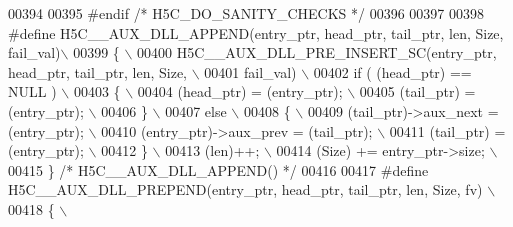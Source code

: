 \begin{DoxyCode}
00394 
00395 \textcolor{preprocessor}{#endif }\textcolor{comment}{/* H5C\_DO\_SANITY\_CHECKS */}\textcolor{preprocessor}{}
00396 
00397 
00398 \textcolor{preprocessor}{#define H5C\_\_AUX\_DLL\_APPEND(entry\_ptr, head\_ptr, tail\_ptr, len, Size, fail\_val)\(\backslash\)}
00399 \textcolor{preprocessor}{\{                                                                              \(\backslash\)}
00400 \textcolor{preprocessor}{    H5C\_\_AUX\_DLL\_PRE\_INSERT\_SC(entry\_ptr, head\_ptr, tail\_ptr, len, Size,       \(\backslash\)}
00401 \textcolor{preprocessor}{                               fail\_val)                                       \(\backslash\)}
00402 \textcolor{preprocessor}{    if ( (head\_ptr) == NULL )                                                  \(\backslash\)}
00403 \textcolor{preprocessor}{    \{                                                                          \(\backslash\)}
00404 \textcolor{preprocessor}{       (head\_ptr) = (entry\_ptr);                                               \(\backslash\)}
00405 \textcolor{preprocessor}{       (tail\_ptr) = (entry\_ptr);                                               \(\backslash\)}
00406 \textcolor{preprocessor}{    \}                                                                          \(\backslash\)}
00407 \textcolor{preprocessor}{    else                                                                       \(\backslash\)}
00408 \textcolor{preprocessor}{    \{                                                                          \(\backslash\)}
00409 \textcolor{preprocessor}{       (tail\_ptr)->aux\_next = (entry\_ptr);                                     \(\backslash\)}
00410 \textcolor{preprocessor}{       (entry\_ptr)->aux\_prev = (tail\_ptr);                                     \(\backslash\)}
00411 \textcolor{preprocessor}{       (tail\_ptr) = (entry\_ptr);                                               \(\backslash\)}
00412 \textcolor{preprocessor}{    \}                                                                          \(\backslash\)}
00413 \textcolor{preprocessor}{    (len)++;                                                                   \(\backslash\)}
00414 \textcolor{preprocessor}{    (Size) += entry\_ptr->size;                                                 \(\backslash\)}
00415 \textcolor{preprocessor}{\} }\textcolor{comment}{/* H5C\_\_AUX\_DLL\_APPEND() */}\textcolor{preprocessor}{}
00416 
00417 \textcolor{preprocessor}{#define H5C\_\_AUX\_DLL\_PREPEND(entry\_ptr, head\_ptr, tail\_ptr, len, Size, fv)   \(\backslash\)}
00418 \textcolor{preprocessor}{\{                                                                            \(\backslash\)}

\end{DoxyCode}
